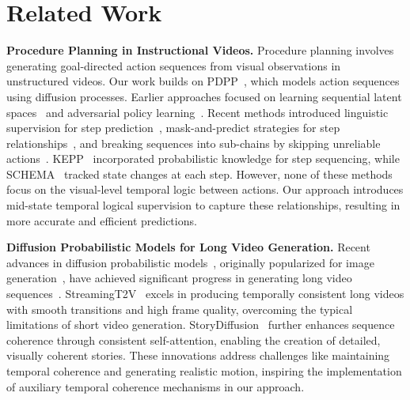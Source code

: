 \section{Related Work}
\label{gen_inst}
\textbf{Procedure Planning in Instructional Videos.} Procedure planning involves generating goal-directed action sequences from visual observations in unstructured videos. Our work builds on PDPP~\citep{wang2023pdpp}, which models action sequences using diffusion processes. Earlier approaches focused on learning sequential latent spaces~\citep{chang2020procedure} and adversarial policy learning~\citep{bi2021procedure}. Recent methods introduced linguistic supervision for step prediction~\citep{zhao2022p3iv}, mask-and-predict strategies for step relationships~\citep{wang2023event}, and breaking sequences into sub-chains by skipping unreliable actions~\citep{li2023skip}. KEPP~\citep{nagasinghe2024not} incorporated probabilistic knowledge for step sequencing, while SCHEMA~\citep{niu2024schema} tracked state changes at each step. However, none of these methods focus on the visual-level temporal logic between actions. Our approach introduces mid-state temporal logical supervision to capture these relationships, resulting in more accurate and efficient predictions.


\textbf{Diffusion Probabilistic Models for Long Video Generation.} 
Recent advances in diffusion probabilistic models~\citep{croitoru2023diffusion}, originally popularized for image generation~\citep{rombach2022high}, have achieved significant progress in generating long video sequences~\citep{weng2024art,zhou2024upscale,jiang2024videobooth}. StreamingT2V~\citep{henschel2024streamingt2v} excels in producing temporally consistent long videos with smooth transitions and high frame quality, overcoming the typical limitations of short video generation. StoryDiffusion~\citep{zhou2024storydiffusion} further enhances sequence coherence through consistent self-attention, enabling the creation of detailed, visually coherent stories. These innovations address challenges like maintaining temporal coherence and generating realistic motion, inspiring the implementation of auxiliary temporal coherence mechanisms in our approach.
